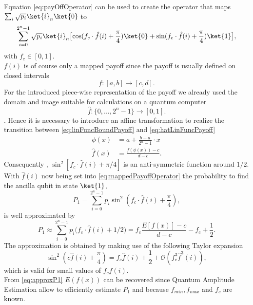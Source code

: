\documentclass[../../main.tex]{subfiles}
\begin{document}
Equation \ref{eq:payOffOperator} can be used to create the operator that maps $\sum_i \sqrt{p_i} \ket{i}_n \ket{0}$ to
\begin{equation}\label{eq:mappedPayoffOperator}
  \sum_{i=0}^{2^n-1} \sqrt{p_i} \ket{i}_n \bigl[ \text{cos}( f_c \cdot \hat{f}(i) + \frac{\pi}{4}) \ket{0} +
   \text{sin} (f_c \cdot \hat{f}(i) + \frac{\pi}{4}) \ket{1} \bigr],
\end{equation}
with $f_c \in [ 0,1 ]$. \\
$f(i)$ is of course only a mapped payoff since the payoff is usually defined on closed intervals
\begin{equation}\label{eq:linFuncBoundPayoff}
  f: [ a,b ] \rightarrow [ c,d ].
\end{equation}
For the introduced piece-wise representation of the payoff we already used the domain and image suitable for calculations on a quantum computer
\begin{equation}\label{eq:hatLinFuncPayoff}
  \hat{f}: \{0,...,2^n-1 \} \rightarrow [ 0,1 ].
\end{equation}.
Hence it is necessary to introduce an affine transformation to realize the transition between \ref{eq:linFuncBoundPayoff} and \ref{eq:hatLinFuncPayoff}
\begin{align}\label{eq:affinTransformPayoff}
  \phi(x) &= a + \frac{b-a}{2^n-1} \cdot x \\
  \hat{f}(x) &= \frac{f(\phi(x))-c}{d-c}.
\end{align}
Consequently , $\sin^2 [f_c \cdot \hat{f}(i) + \pi/4 ] $ is an anti-symmetric function around $1/2$.
With $\hat{f}(i)$ now being set into \ref{eq:mappedPayoffOperator} the probability to find the ancilla qubit in state $\ket{1}$,
\begin{equation}\label{eq:probability1MappedLinFunc}
  P_1 = \sum_{i=0}^{2^n-1} p_i \sin^2(f_c \cdot \hat{f}(i) + \frac{\pi}{4}), 
\end{equation}
is well approximated by 
\begin{equation}\label{eq:approxP1}
  P_1 \approx \sum_{i=0}^{2^n-1} p_i \bigl( f_c \cdot \hat{f}(i) + 1/2 \bigr) = f_c \frac{E[ f(x) ] - c}{d-c} - f_c + \frac{1}{2}.
\end{equation}
The approximation is obtained by making use of the following Taylor expansion
\begin{equation}\label{eq:sinTaylor}
  \sin^2(c \hat{f}(i) + \frac{\pi}{4}) = f_c \hat{f}(i) + \frac{1}{2} + \mathcal{O}(f_c^3 \hat{f}^3(i)),
\end{equation}
which is valid for small values of $ f_c \hat{f}(i) $.\\
From \ref{eq:approxP1} $E(f(x))$ can be recovered since Quantum Amplitude Estimation allow to efficiently estimate $P_1$ and because $f_{min}, f_{max}$ and $f_c$
are known.
\end{document}
